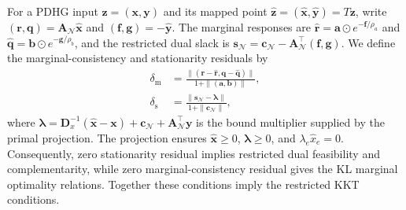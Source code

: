 For a PDHG input $\mathbf{z}=(\mathbf{x},\mathbf{y})$ and its mapped point $\widehat{\mathbf{z}}=(\widehat{\mathbf{x}},\widehat{\mathbf{y}})=T\mathbf{z}$, write $(\mathbf{r},\mathbf{q})=\mathbf{A}_{\mathcal N}\widehat{\mathbf{x}}$ and $(\mathbf{f},\mathbf{g})=-\widehat{\mathbf{y}}$.
The marginal responses are $\widehat{\mathbf{r}}=\mathbf{a}\odot e^{-\mathbf{f}/\rho_a}$ and $\widehat{\mathbf{q}}=\mathbf{b}\odot e^{-\mathbf{g}/\rho_b}$, and the restricted dual slack is $\mathbf{s}_{\mathcal N}=\mathbf{c}_{\mathcal N}-\mathbf{A}_{\mathcal N}^\top(\mathbf{f},\mathbf{g})$.
We define the marginal-consistency and stationarity residuals by
\begin{equation*}
\begin{aligned}
\delta_{\mathrm m}&=\frac{\|(\mathbf{r}-\widehat{\mathbf{r}},\mathbf{q}-\widehat{\mathbf{q}})\|}{1+\|(\mathbf{a},\mathbf{b})\|},\\
\delta_{\mathrm s}&=\frac{\|\mathbf{s}_{\mathcal N}-\boldsymbol{\lambda}\|}{1+\|\mathbf{c}_{\mathcal N}\|},
\end{aligned}
\end{equation*}
where $\boldsymbol{\lambda}=\mathbf{D}_x^{-1}(\widehat{\mathbf{x}}-\mathbf{x})+\mathbf{c}_{\mathcal N}+\mathbf{A}_{\mathcal N}^\top \mathbf{y}$ is the bound multiplier supplied by the primal projection.
The projection ensures $\widehat{\mathbf{x}}\geq0$, $\boldsymbol{\lambda}\geq0$, and $\lambda_e\widehat x_e=0$.
Consequently, zero stationarity residual implies restricted dual feasibility and complementarity, while zero marginal-consistency residual gives the KL marginal optimality relations.
Together these conditions imply the restricted KKT conditions.

